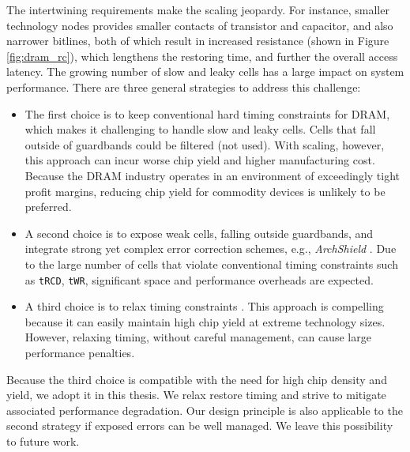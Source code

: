 The intertwining requirements make the scaling jeopardy. For instance, smaller technology nodes provides smaller contacts of transistor and capacitor, and also narrower bitlines, both of which result in increased resistance (shown in Figure \ref{fig:dram_rc}), which lengthens the restoring time, and further the overall access latency. The growing number of slow and leaky cells has a large impact on system performance. 
There are three general strategies to address this challenge:
\begin{itemize}
\itemsep -1pt
\item 
The first choice is to keep conventional hard timing constraints for DRAM, 
which makes it challenging to handle slow and leaky cells.  Cells that fall
outside of guardbands could be filtered (not used).
With scaling, however, this approach can incur worse chip yield
and higher manufacturing cost. 
Because the DRAM industry operates in an environment of exceedingly tight profit
margins, reducing chip yield for commodity devices is unlikely to be preferred.

\item 
A second choice is to expose weak cells, falling outside guardbands, and integrate strong yet complex error correction schemes, e.g., \textit{ArchShield} \cite{ISCA13:archshield}. Due to the large number of cells that violate conventional timing constraints such as {\tt tRCD}, {\tt tWR}, significant space and performance overheads are expected.

\item
A third choice is to relax timing constraints \cite{MEM14:twr, DATE15:twr}. This approach is compelling because it can easily maintain high chip yield at extreme technology sizes. 
However, relaxing timing, without careful management, can cause 
large performance penalties.  
\end{itemize} 
%
Because the third choice is compatible with the need for high chip density 
and yield, we adopt it in this thesis.  We relax restore timing and strive to mitigate associated 
performance degradation. 
Our design principle is also applicable to the second strategy if exposed errors 
can be well managed. We leave this possibility to future work.

